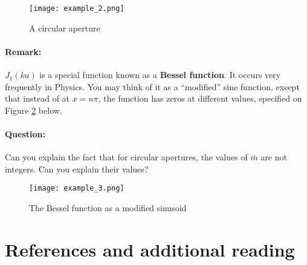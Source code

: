 \begin{figure}[!htb]
\centering
\texttt{[image: example\_2.png]}
\caption{A circular aperture}
\label{example_2}
\end{figure}


\begin{tcolorbox}
\paragraph{Remark: } $J_1(ka)$ is a special function known as a \textbf{Bessel function}. It occurs very frequently in Physics. You may think of it as a ``modified'' sine function, except that instead of at $x=n\pi$, the function has zeros at different values, specified on Figure \ref{example_3} below.

\paragraph{Question: } Can you explain the fact that for circular apertures, the values of $\bar{m}$ are not integers. Can you explain their values?
\end{tcolorbox}

\begin{figure}[!htb]
\centering
\texttt{[image: example\_3.png]}
\caption{The Bessel function as a modified sinusoid}
\label{example_3}
\end{figure}

\newpage

\section*{References and additional reading}

